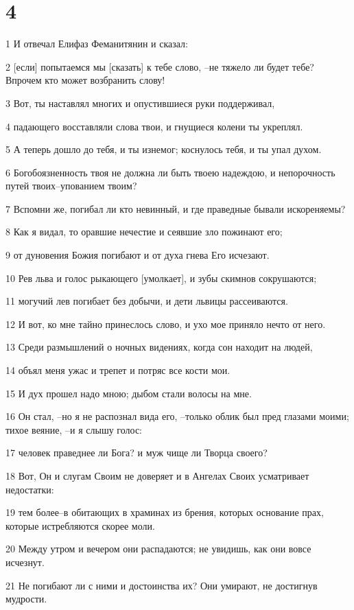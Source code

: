 \chapter{4}

\par 1 И отвечал Елифаз Феманитянин и сказал:
\par 2 [если] попытаемся мы [сказать] к тебе слово, --не тяжело ли будет тебе? Впрочем кто может возбранить слову!
\par 3 Вот, ты наставлял многих и опустившиеся руки поддерживал,
\par 4 падающего восставляли слова твои, и гнущиеся колени ты укреплял.
\par 5 А теперь дошло до тебя, и ты изнемог; коснулось тебя, и ты упал духом.
\par 6 Богобоязненность твоя не должна ли быть твоею надеждою, и непорочность путей твоих--упованием твоим?
\par 7 Вспомни же, погибал ли кто невинный, и где праведные бывали искореняемы?
\par 8 Как я видал, то оравшие нечестие и сеявшие зло пожинают его;
\par 9 от дуновения Божия погибают и от духа гнева Его исчезают.
\par 10 Рев льва и голос рыкающего [умолкает], и зубы скимнов сокрушаются;
\par 11 могучий лев погибает без добычи, и дети львицы рассеиваются.
\par 12 И вот, ко мне тайно принеслось слово, и ухо мое приняло нечто от него.
\par 13 Среди размышлений о ночных видениях, когда сон находит на людей,
\par 14 объял меня ужас и трепет и потряс все кости мои.
\par 15 И дух прошел надо мною; дыбом стали волосы на мне.
\par 16 Он стал, --но я не распознал вида его, --только облик был пред глазами моими; тихое веяние, --и я слышу голос:
\par 17 человек праведнее ли Бога? и муж чище ли Творца своего?
\par 18 Вот, Он и слугам Своим не доверяет и в Ангелах Своих усматривает недостатки:
\par 19 тем более--в обитающих в храминах из брения, которых основание прах, которые истребляются скорее моли.
\par 20 Между утром и вечером они распадаются; не увидишь, как они вовсе исчезнут.
\par 21 Не погибают ли с ними и достоинства их? Они умирают, не достигнув мудрости.

